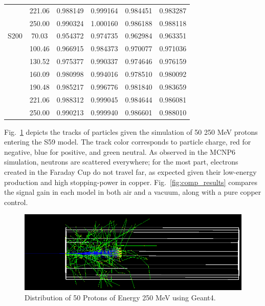 \documentclass{mc2015}
\begin{document}
\begin{table}[H]
\begin{tabular}{lccccc}
        & 221.06 & \num{0.988149} & \num{0.999164} & \num{0.984451} & \num{0.983287} \\
        & 250.00 & \num{0.990324} & \num{1.000160} & \num{0.986188} & \num{0.988118} \\
    \midrule
    S200 & 70.03 & \num{0.954372} & \num{0.974735} & \num{0.962984} & \num{0.963351} \\
        & 100.46 & \num{0.966915} & \num{0.984373} & \num{0.970077} & \num{0.971036} \\
        & 130.52 & \num{0.975377} & \num{0.990337} & \num{0.974646} & \num{0.976159} \\
        & 160.09 & \num{0.980998} & \num{0.994016} & \num{0.978510} & \num{0.980092} \\
        & 190.48 & \num{0.985217} & \num{0.996776} & \num{0.981840} & \num{0.983659} \\
        & 221.06 & \num{0.988312} & \num{0.999045} & \num{0.984644} & \num{0.986081} \\
        & 250.00 & \num{0.990213} & \num{0.999940} & \num{0.986601} & \num{0.988010} \\
    \bottomrule
  \end{tabular}
  \label{tab:geant4_data}
\end{table}

Fig.~\ref{fig:G4_dist} depicts the tracks of particles given the simulation of 50 250 MeV protons entering the S59 model.  The track color corresponds to particle charge, red for negative, blue for positive, and green neutral.  As observed in the MCNP6 simulation, neutrons are scattered everywhere; for the most part, electrons created in the Faraday Cup do not travel far, as expected given their low-energy production and high stopping-power in copper. Fig.~\ref{fig:comp_results} compares the signal gain in each model in both air and a vacuum, along with a pure copper control.

\begin{figure}[H]
  \centering
  \includegraphics[width=5in]{figures/fig_G4_dist.png}
  \caption{Distribution of 50 Protons of Energy 250 MeV using Geant4.}
  \label{fig:G4_dist}
\end{figure}
\end{document}
